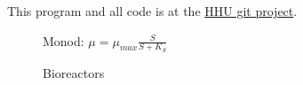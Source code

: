 \documentclass[12pt,a4paper]{scrartcl}
\begin{document}
This program and all code is at the \href{https://git.hhu.de/machne/pbr_hackathon_201503/tree/master}{HHU git project}.

\begin{figure}[ht]
  \begin{minipage}{.49\textwidth}
  \end{minipage}
  \begin{minipage}{.49\textwidth}
    \centering Monod: $\mu = \mu_{max} \frac{S}{S+K_S}$\\
  \end{minipage}
\caption[]{Bioreactors}
\end{figure}

\end{document}
